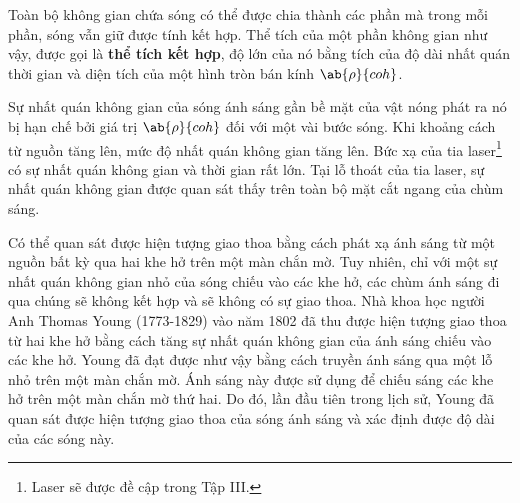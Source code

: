 Toàn bộ không gian chứa sóng có thể được chia thành các phần mà trong mỗi phần, sóng vẫn giữ được tính kết hợp.
Thể tích của một phần không gian như vậy, được gọi là \textbf{thể tích kết hợp}, độ lớn của nó bằng tích của độ dài nhất quán thời gian và diện tích của một hình tròn bán kính $\ab{\rho}{coh}$.

Sự nhất quán không gian của sóng ánh sáng gần bề mặt của vật nóng phát ra nó bị hạn chế bởi giá trị $\ab{\rho}{coh}$ đối với một vài bước sóng.
Khi khoảng cách từ nguồn tăng lên, mức độ nhất quán không gian tăng lên.
Bức xạ của tia laser\footnote{Laser sẽ được đề cập trong Tập III.} có sự nhất quán không gian và thời gian rất lớn.
Tại lỗ thoát của tia laser, sự nhất quán không gian được quan sát thấy trên toàn bộ mặt cắt ngang của chùm sáng.

Có thể quan sát được hiện tượng giao thoa bằng cách phát xạ ánh sáng từ một nguồn bất kỳ qua hai khe hở trên một màn chắn mờ.
Tuy nhiên, chỉ với một sự nhất quán không gian nhỏ của sóng chiếu vào các khe hở, các chùm ánh sáng đi qua chúng sẽ không kết hợp và sẽ không có sự giao thoa.
Nhà khoa học người Anh Thomas Young (1773-1829) vào năm 1802 đã thu được hiện tượng giao thoa từ hai khe hở bằng cách tăng sự nhất quán không gian của ánh sáng chiếu vào các khe hở.
Young đã đạt được như vậy bằng cách truyền ánh sáng qua một lỗ nhỏ trên một màn chắn mờ.
Ánh sáng này được sử dụng để chiếu sáng các khe hở trên một màn chắn mờ thứ hai.
Do đó, lần đầu tiên trong lịch sử, Young đã quan sát được hiện tượng giao thoa của sóng ánh sáng và xác định được độ dài của các sóng này.

